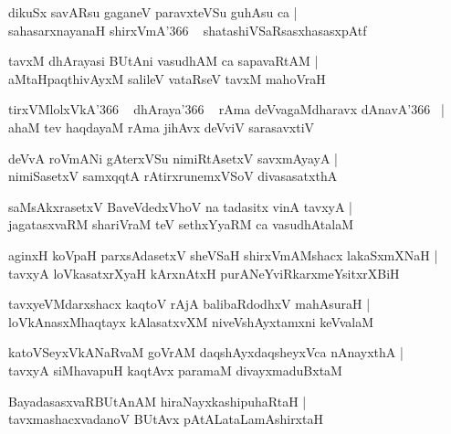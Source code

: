 \documentclass[twoside,12pt,openright]{book}
\newcounter{shloka}[chapter]
\begin{document}
\begin{shloka}%
dikuSx savARsu gaganeV paravxteVSu guhAsu ca |\\
sahasarxnayanaH shirxVmA\char'366 ~ shatashiVSaRsasxhasasxpAtf
\end{shloka}

\begin{shloka}%
tavxM dhArayasi BUtAni vasudhAM ca sapavaRtAM |\\
aMtaHpaqthivAyxM salileV vataRseV tavxM mahoVraH 
\end{shloka}

\begin{shloka}%
tirxVMlolxVkA\char'366 ~ dhAraya\char'366 ~ rAma deVvagaMdharavx dAnavA\char'366 ~|\\
ahaM tev haqdayaM rAma jihAvx deVviV sarasavxtiV 
\end{shloka}

\begin{shloka}%
deVvA roVmANi gAterxVSu nimiRtAsetxV savxmAyayA |\\
nimiSasetxV samxqqtA rAtirxrunemxVSoV divasasatxthA 
\end{shloka}

\begin{shloka}%
saMsAkxrasetxV BaveVdedxVhoV na tadasitx vinA tavxyA |\\
jagatasxvaRM shariVraM teV sethxYyaRM ca vasudhAtalaM 
\end{shloka}

\begin{shloka}%
aginxH koVpaH parxsAdasetxV sheVSaH shirxVmAMshacx lakaSxmXNaH |\\
tavxyA loVkasatxrXyaH kArxnAtxH purANeYviRkarxmeYsitxrXBiH 
\end{shloka}

\begin{shloka}%
tavxyeVMdarxshacx kaqtoV rAjA balibaRdodhxV mahAsuraH |\\
loVkAnasxMhaqtayx kAlasatxvXM niveVshAyxtamxni keVvalaM 
\end{shloka}

\begin{shloka}%
katoVSeyxVkANaRvaM goVrAM daqshAyxdaqsheyxVca nAnayxthA |\\
tavxyA siMhavapuH kaqtAvx paramaM divayxmaduBxtaM 
\end{shloka}

\begin{shloka}%
BayadasasxvaRBUtAnAM hiraNayxkashipuhaRtaH |\\
tavxmashacxvadanoV BUtAvx pAtALataLamAshirxtaH 
\end{shloka}
\end{document}
